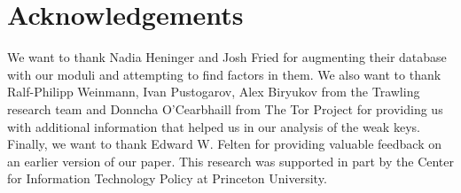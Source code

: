 \section*{Acknowledgements}
We want to thank Nadia Heninger and Josh Fried for augmenting their database
with our moduli and attempting to find factors in them. We also want to
thank Ralf-Philipp Weinmann, Ivan Pustogarov, Alex Biryukov from the Trawling
research team and Donncha O'Cearbhaill from The Tor Project for providing us
with additional information that helped us in our analysis of the weak keys.
Finally, we want to thank Edward W. Felten for providing valuable feedback on an
earlier version of our paper.  This research was supported in part by the Center
for Information Technology Policy at Princeton University.
